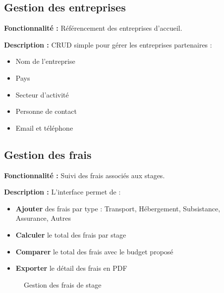 \documentclass[12pt,a4paper]{report}
\begin{document}
\subsection{Gestion des entreprises}

\textbf{Fonctionnalité :} Référencement des entreprises d'accueil.

\textbf{Description :} CRUD simple pour gérer les entreprises partenaires :

\begin{itemize}[leftmargin=1cm]
    \item Nom de l'entreprise
    \item Pays
    \item Secteur d'activité
    \item Personne de contact
    \item Email et téléphone
\end{itemize}

\subsection{Gestion des frais}

\textbf{Fonctionnalité :} Suivi des frais associés aux stages.

\textbf{Description :} L'interface permet de :

\begin{itemize}[leftmargin=1cm]
    \item \textbf{Ajouter} des frais par type : Transport, Hébergement, Subsistance, Assurance, Autres
    \item \textbf{Calculer} le total des frais par stage
    \item \textbf{Comparer} le total des frais avec le budget proposé
    \item \textbf{Exporter} le détail des frais en PDF
\end{itemize}

\begin{figure}[H]
\centering
{}
\caption{Gestion des frais de stage}
\end{figure}
\end{document}
